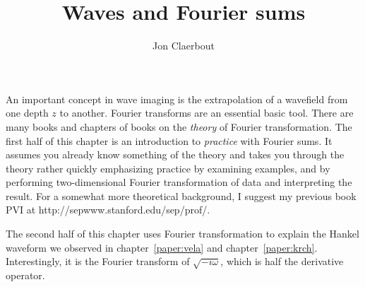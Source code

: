 \def\CAKEDIR{.}

\title{Waves and Fourier sums}
\author{Jon Claerbout}
\maketitle
\label{paper:ft1}



\par
An important concept in wave imaging is the extrapolation
of a wavefield from one depth $z$ to another.
Fourier transforms are an essential basic tool.
There are many books and chapters of books on the
{\em  theory}
of Fourier transformation.
The first half of this chapter is
an introduction to {\em  practice} with Fourier sums.
It assumes you already know something of the theory
and takes you through the theory rather quickly
emphasizing practice by examining examples,
and by performing two-dimensional
Fourier transformation of data and interpreting the result.
For a somewhat more theoretical background,
I suggest my previous book PVI at
http://sepwww.stanford.edu/sep/prof/.


\par
The second half of this chapter
uses Fourier transformation
to explain the Hankel waveform we observed
in chapter~\ref{paper:vela} and chapter~\ref{paper:krch}.
Interestingly,
it is the Fourier transform of $\sqrt{-i\omega}$,
which is half the derivative operator.


